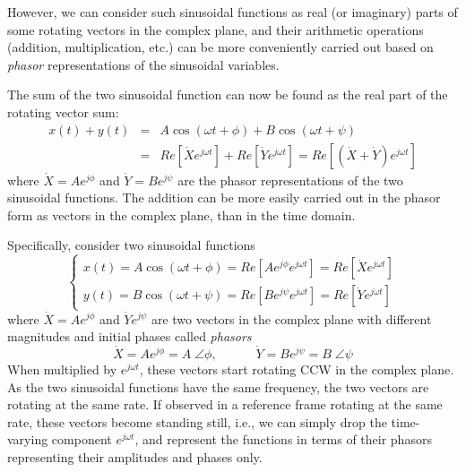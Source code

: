 \documentclass{article}
\begin{document}
However, we can consider such sinusoidal functions as real (or imaginary)
parts of some rotating vectors in the complex plane, and their arithmetic
operations (addition, multiplication, etc.) can be more conveniently
carried out based on {\em phasor} representations of the sinusoidal
variables.


The sum of the two sinusoidal function can now be found as the real part of
the rotating vector sum:
\begin{eqnarray}
  x(t)+y(t)&=&A\cos(\omega t+\phi)+B\cos(\omega t+\psi)
  \nonumber\\
  &=&Re[\dot{X}e^{j\omega t}]+Re[\dot{Y}e^{j\omega t}]
  =Re[(\dot{X}+\dot{Y})e^{j\omega t}]
\end{eqnarray}
where $\dot{X}=Ae^{j\phi}$ and $\dot{Y}=B e^{j\psi}$ are the phasor 
representations of the two sinusoidal functions. The addition can be more 
easily carried out in the phasor form as vectors in the complex plane, 
than in the time domain.



Specifically, consider two sinusoidal functions 
\begin{equation}
  \left\{ \begin{array}{l}
    x(t)=A\cos(\omega t+\phi)=Re[A e^{j\phi}e^{j\omega t}]=Re[\dot{X}e^{j\omega t}]\\
    y(t)=B\cos(\omega t+\psi)=Re[B e^{j\psi}e^{j\omega t}]=Re[\dot{Y}e^{j\omega t}]
  \end{array} \right. 
\end{equation}
where $\dot{X}=A e^{j\phi}$ and $\dot{Y} e^{j\psi}$ are two vectors in 
the complex plane with different magnitudes and initial phases called 
{\em phasors} 
\begin{equation}
  \dot{X}=Ae^{j\phi}=A\;\angle\phi,
  \;\;\;\;\;\;\;\;\;\;\;\dot{Y}=Be^{j\psi}=B\;\angle\psi
\end{equation}
When multiplied by $e^{j\omega t}$, these vectors start rotating CCW in the
complex plane. As the two sinusoidal functions have the same frequency, 
the two vectors are rotating at the same rate. If observed in a reference
frame rotating at the same rate, these vectors become standing still, 
i.e., we can simply drop the time-varying component $e^{j\omega t}$, and 
represent the functions in terms of their phasors representing their
amplitudes and phases only.
\end{document}
